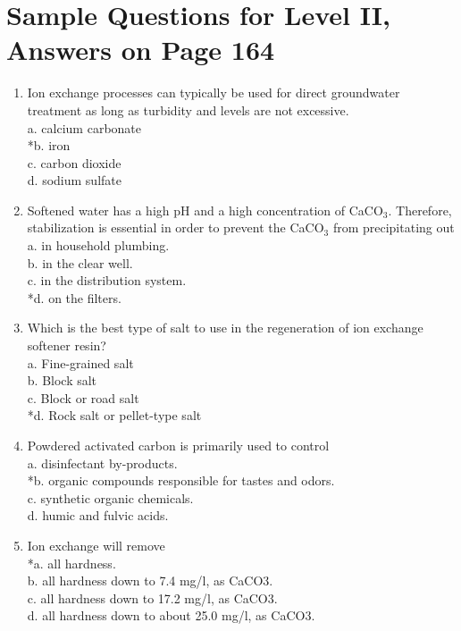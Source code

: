 \section{Sample Questions for Level II, Answers on Page 164}
\begin{enumerate}[label=TII-\arabic*]
  \item Ion exchange processes can typically be used for direct groundwater treatment as long as turbidity and levels are not excessive.\\
a. calcium carbonate\\
*b. iron\\
c. carbon dioxide\\
d. sodium sulfate \\
\item Softened water has a high pH and a high concentration of CaCO$_{3}$. Therefore, stabilization is essential in order to prevent the CaCO$_{3}$ from precipitating out\\
a. in household plumbing.\\
b. in the clear well.\\
c. in the distribution system.\\
*d. on the filters.\\
  \item Which is the best type of salt to use in the regeneration of ion exchange softener resin?\\
a. Fine-grained salt\\
b. Block salt\\
c. Block or road salt\\
*d. Rock salt or pellet-type salt\\
  \item Powdered activated carbon is primarily used to control\\
a. disinfectant by-products.\\
*b. organic compounds responsible for tastes and odors.\\
c. synthetic organic chemicals.\\
d. humic and fulvic acids.\\
  \item Ion exchange will remove\\
*a. all hardness.\\
b. all hardness down to 7.4 mg/l, as CaCO3.\\
c. all hardness down to 17.2 mg/l, as CaCO3.\\
d. all hardness down to about 25.0 mg/l, as CaCO3.\\
\end{enumerate}
